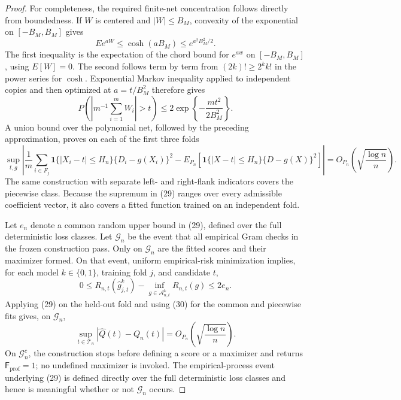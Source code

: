 \documentclass{article}
\begin{document}
\begin{proof}
For completeness, the required finite-net concentration follows
directly from boundedness.  If \(W\) is centered and
\(|W|\le B_M\), convexity of the exponential on
\([-B_M,B_M]\) gives
\[
 E e^{aW}\le\cosh(aB_M)\le e^{a^2B_M^2/2}.
 \tag{27}
\]
The first inequality is the expectation of the chord bound for
\(e^{aw}\) on \([-B_M,B_M]\), using \(E[W]=0\).  The second follows
term by term from
\((2k)!\ge2^k k!\) in the power series for \(\cosh\).
Exponential Markov inequality applied to independent copies and then
optimized at \(a=t/B_M^2\) therefore gives
\[
 P\left(\left|m^{-1}\sum_{i=1}^mW_i\right|>t\right)
 \le2\exp\left\{-\frac{mt^2}{2B_M^2}\right\}.
 \tag{28}
\]
A union bound over the polynomial net, followed by the preceding
approximation, proves on each of the first three folds
\[
 \sup_{t,g}\left|
  \frac1m\sum_{i\in F_j}\mathbf 1\{|X_i-t|\le H_n\}
       \{D_i-g(X_i)\}^2
  -E_{P_n}\!\left[\mathbf 1\{|X-t|\le H_n\}
       \{D-g(X)\}^2\right]
 \right|
 =O_{P_n}\!\left(\sqrt{\frac{\log n}{n}}\right).
 \tag{29}
\]
The same construction with separate left- and right-flank indicators
covers the piecewise class.  Because the supremum in (29) ranges over
every admissible coefficient vector, it also covers a fitted function
trained on an independent fold.

Let \(e_n\) denote a common random upper bound in (29), defined over
the full deterministic loss classes.  Let \(\mathcal G_n\) be the
event that all empirical Gram checks in the frozen construction pass.
Only on \(\mathcal G_n\) are the fitted scores and their maximizer
formed.  On that event, uniform empirical-risk minimization implies,
for each model \(k\in\{0,1\}\), training fold \(j\), and candidate
\(t\),
\[
 0\le R_{n,t}(\widehat g_{j,t}^{k})
       -\inf_{g\in\mathcal A_{n,t}^k}R_{n,t}(g)\le2e_n.
 \tag{30}
\]
Applying (29) on the held-out fold and using (30) for the common and
piecewise fits gives, on \(\mathcal G_n\),
\[
 \sup_{t\in\mathcal T_n}|\widehat Q(t)-Q_n(t)|
 =O_{P_n}\!\left(\sqrt{\frac{\log n}{n}}\right).
 \tag{31}
\]
On \(\mathcal G_n^c\), the construction stops
before defining a score or a maximizer and returns
\(\mathsf F_{\mathrm{prof}}=1\); no undefined maximizer is invoked.
The empirical-process event underlying (29) is defined directly over
the full deterministic loss classes and hence is meaningful whether
or not \(\mathcal G_n\) occurs.


\end{proof}
\end{document}
